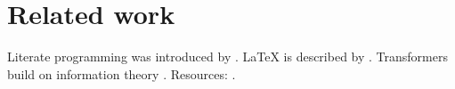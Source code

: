 \documentclass{article}
\begin{document}
\section{Related work}
Literate programming was introduced by \citet{knuth1984}. \LaTeX{} is described by \citet{lamport1994}. Transformers \citep{vaswani2017} build on information theory \citep[see][p.~380]{shannon1948}. Resources: \citep{ctan,doe2020}.


\end{document}
